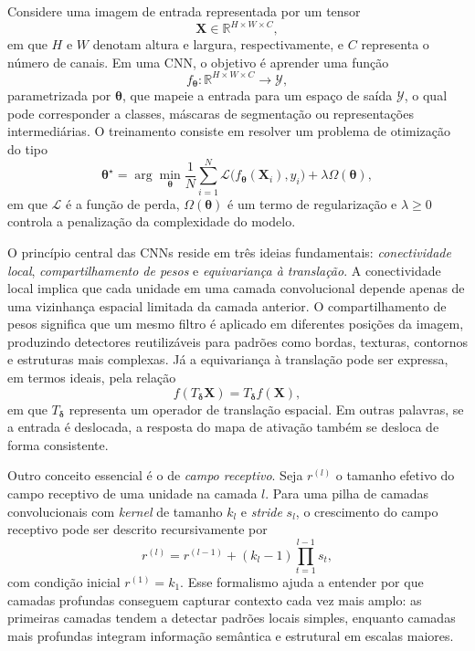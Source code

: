 \documentclass[tcc,capa]{texufpel}
\begin{document}
Considere uma imagem de entrada representada por um tensor
\begin{equation}
\mathbf{X} \in \mathbb{R}^{H \times W \times C},
\end{equation}
em que $H$ e $W$ denotam altura e largura, respectivamente, e $C$ representa o número de canais. Em uma CNN, o objetivo é aprender uma função
\begin{equation}
f_{\boldsymbol{\theta}}: \mathbb{R}^{H \times W \times C} \to \mathcal{Y},
\end{equation}
parametrizada por $\boldsymbol{\theta}$, que mapeie a entrada para um espaço de saída $\mathcal{Y}$, o qual pode corresponder a classes, máscaras de segmentação ou representações intermediárias. O treinamento consiste em resolver um problema de otimização do tipo
\begin{equation}
\boldsymbol{\theta}^{\star} = \arg\min_{\boldsymbol{\theta}} \frac{1}{N}\sum_{i=1}^{N}\mathcal{L}\big(f_{\boldsymbol{\theta}}(\mathbf{X}_i), y_i\big) + \lambda \Omega(\boldsymbol{\theta}),
\end{equation}
em que $\mathcal{L}$ é a função de perda, $\Omega(\boldsymbol{\theta})$ é um termo de regularização e $\lambda \geq 0$ controla a penalização da complexidade do modelo.

O princípio central das CNNs reside em três ideias fundamentais: \textit{conectividade local}, \textit{compartilhamento de pesos} e \textit{equivariança à translação}. A conectividade local implica que cada unidade em uma camada convolucional depende apenas de uma vizinhança espacial limitada da camada anterior. O compartilhamento de pesos significa que um mesmo filtro é aplicado em diferentes posições da imagem, produzindo detectores reutilizáveis para padrões como bordas, texturas, contornos e estruturas mais complexas. Já a equivariança à translação pode ser expressa, em termos ideais, pela relação
\begin{equation}
f(T_{\boldsymbol{\delta}}\mathbf{X}) = T_{\boldsymbol{\delta}}f(\mathbf{X}),
\end{equation}
em que $T_{\boldsymbol{\delta}}$ representa um operador de translação espacial. Em outras palavras, se a entrada é deslocada, a resposta do mapa de ativação também se desloca de forma consistente.

Outro conceito essencial é o de \textit{campo receptivo}. Seja $r^{(l)}$ o tamanho efetivo do campo receptivo de uma unidade na camada $l$. Para uma pilha de camadas convolucionais com \textit{kernel} de tamanho $k_l$ e \textit{stride} $s_l$, o crescimento do campo receptivo pode ser descrito recursivamente por
\begin{equation}
r^{(l)} = r^{(l-1)} + (k_l - 1)\prod_{t=1}^{l-1}s_t,
\end{equation}
com condição inicial $r^{(1)} = k_1$. Esse formalismo ajuda a entender por que camadas profundas conseguem capturar contexto cada vez mais amplo: as primeiras camadas tendem a detectar padrões locais simples, enquanto camadas mais profundas integram informação semântica e estrutural em escalas maiores.
\end{document}
